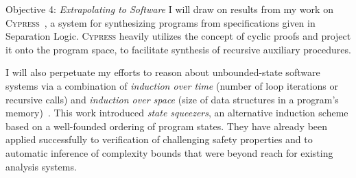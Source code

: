 \begin{paragraph}{Objective 4: {\it Extrapolating to Software}}
I will draw on results from my work on \textsc{Cypress}~\cite{cypress}, a system for synthesizing programs from specifications given in Separation Logic.
\textsc{Cypress} heavily utilizes the concept of cyclic proofs and project it onto the program space,
to facilitate synthesis of recursive auxiliary procedures.

I will also perpetuate my efforts to reason about unbounded-state software systems via a combination of \emph{induction over time} (number of loop iterations or recursive calls) and \emph{induction over space} (size of data structures in a program's memory)~\cite{squeezers}.
This work introduced \emph{state squeezers}, an alternative induction scheme based on a well-founded ordering of program states.
They have already been applied successfully to verification of challenging safety properties and to automatic inference of complexity bounds that were beyond reach for existing analysis systems.
\end{paragraph}


\begin{comment}
Another obstacle, which hinders both approaches, is the use of quantification
in assumptions and theorems.
One generally wishes to take advantage of the inherent modularity in proving
most kinds of properties, be those mathematical theorems in algebra or combinatorics,
and definitely when it comes to correctness properties of computer programs.
Software is modular by nature, 
It is very much desirable to adopt the same contributing factor to reasoning about
these programs.
This means that instead of constructing one monolithic proof of the ``ultimate
theorem'', one identifies and proves \emph{lemmas} that abstract and generalize
domain knowledge and understanding of the underlying program --- layering them
up until the final goal is met.
This is definitely how it is done in academic papers, and, more recently, in
large software verification projects.
Going back to the challenge at hand, these auxiliary lemmas typically include
quantified formulas, which are logic's way of expressing generalized conjectures.
Applying these lemmas, \eg in the context of carrying out the next step of the proof,
ultimately requires to instantiate universal quantifiers with logical terms.
Since the space of available terms is large (or even infinite), this becomes
a task that is daunting to automate and requires the employment of heuristics
to select the right instances.
We will move to consolidate instantiation strategies into ones that more closely
matches the search for proof --- thus being goal-directed rather then origin-directed.
A primary aim is to make these strategies less heuristic and more predictable.
\end{comment}


